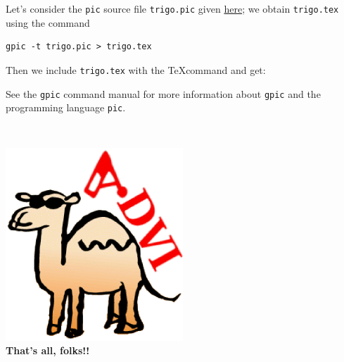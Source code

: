 \documentclass[12pt]{article}
\begin{document}
Let's consider the \verb"pic" source file \verb"trigo.pic" given
\hyperref{trigo_source.dvi}{}{}{here}; we obtain
\verb"trigo.tex" using the command 
\begin{verbatim}
gpic -t trigo.pic > trigo.tex
\end{verbatim}

Then we include \verb"trigo.tex" with the \TeX command
\verb|| and get:

\def\showgraph{%
  \par\medskip\centerline{\raise 1em\box\graph}\bigskip\noindent\ignorespaces}



See the \verb"gpic" command manual for more information about
\verb"gpic" and the programming language \verb"pic".

\lastpage

~\vfill
\begin{center}
\includegraphics[width=0.5\textwidth]{../tex/advilogo.eps}\\
{\Large \bf That's all, folks!!}
\end{center}
\vfill
\end{document}
